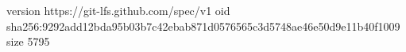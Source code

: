 version https://git-lfs.github.com/spec/v1
oid sha256:9292add12bda95b03b7c42ebab871d0576565c3d5748ae46e50d9e11b40f1009
size 5795
